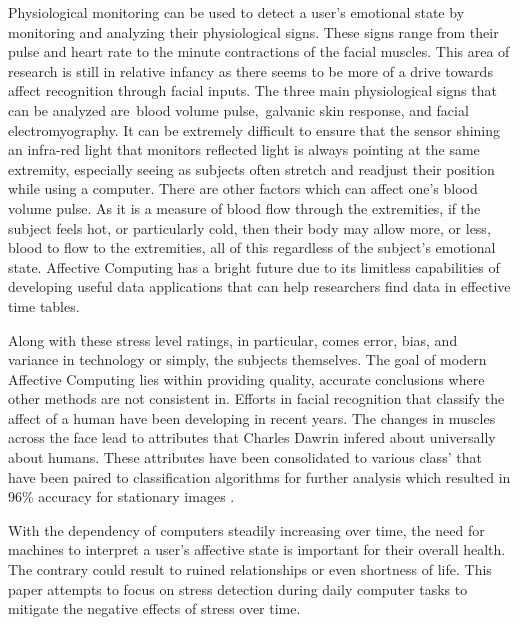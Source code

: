 Physiological monitoring can be used to detect a user’s emotional state by monitoring and analyzing their physiological signs. 
These signs range from their pulse and heart rate to the minute contractions of the facial muscles. This area of research is still 
in relative infancy as there seems to be more of a drive towards affect recognition through facial inputs. \cite{mobile-health} The three main physiological 
signs that can be analyzed are blood volume pulse, galvanic skin response, and facial electromyography. It can be extremely difficult 
to ensure that the sensor shining an infra-red light that monitors reflected light is always pointing at the same extremity, especially 
seeing as subjects often stretch and readjust their position while using a computer. There are other factors which can affect one's 
blood volume pulse. As it is a measure of blood flow through the extremities, if the subject feels hot, or particularly cold, then their 
body may allow more, or less, blood to flow to the extremities, all of this regardless of the subject's emotional state. \cite{IEEE}
Affective Computing has a bright future due to its limitless capabilities of developing useful data applications that can help 
researchers find data in effective time tables. 

Along with these stress level ratings, in particular, comes error, bias, and variance in technology or simply, the subjects themselves.
The goal of modern Affective Computing lies within providing quality, accurate conclusions where other methods are not 
consistent in. Efforts in facial recognition that classify the affect of a human have been developing in recent 
years. The changes in muscles across the face lead to attributes that Charles Dawrin infered about universally about 
humans. These attributes have been consolidated to various class' that have been paired to classification algorithms 
for further analysis which resulted in 96\% accuracy for stationary images \cite{facial-recognition}. 

With the dependency of computers steadily increasing over time, the need for machines to interpret a user's affective state 
is important for their overall health. The contrary could result to ruined relationships or even shortness of life. 
This paper attempts to focus on stress detection during daily computer tasks to mitigate the negative effects of 
stress over time. 
